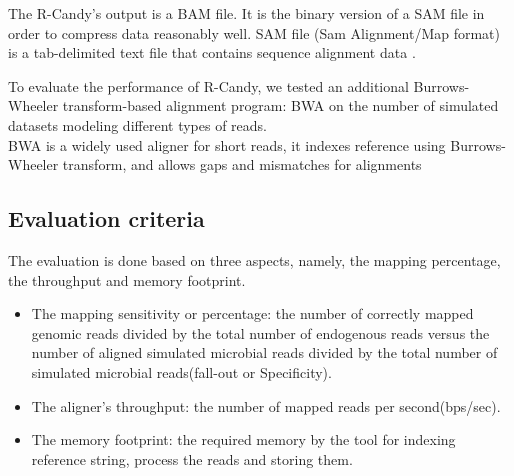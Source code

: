 \documentclass[11pt,a4paper]{report}
\begin{document}
The R-Candy's output is a BAM file. It is the binary version of a SAM file 
in order to compress data reasonably well. SAM file (Sam Alignment/Map format) is 
a tab-delimited text file that contains sequence alignment data \cite{SamSpecification}.   






To evaluate the performance of R-Candy, we tested an additional Burrows-Wheeler 
transform-based alignment program: BWA \cite{bwa} on the number of simulated 
datasets modeling different types of reads. \\
BWA is a widely used aligner for short reads, it indexes reference using Burrows-
Wheeler transform, and allows gaps and mismatches for alignments\\


\subsection{Evaluation criteria}

The evaluation is done based on three aspects, namely, 
the mapping percentage, the throughput and memory footprint.

\begin{itemize}

 \item The mapping sensitivity or percentage:
the number of correctly mapped genomic reads divided by the total number of 
endogenous reads versus the number of aligned simulated microbial reads 
divided by the total number of simulated microbial reads(fall-out or Specificity).

 \item The aligner's throughput: the number of mapped reads per second(bps/sec).

 \item The memory footprint: the required memory by the tool for indexing 
reference string, process the reads and storing them. 

\end{itemize}
\end{document}
